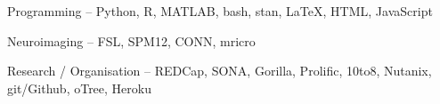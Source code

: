 \datedsubsectionnarrow{}{}
{Programming -- \footnotesize Python, R, MATLAB, bash, stan, \LaTeX, HTML, JavaScript}
{}

\datedsubsectionnarrow{}{}
{Neuroimaging -- \footnotesize FSL, SPM12, CONN, mricro}
{}

\datedsubsectionnarrow{}{}
{Research / Organisation -- \footnotesize REDCap, SONA, Gorilla, Prolific, 10to8, Nutanix, git/Github, oTree, Heroku}
{}
